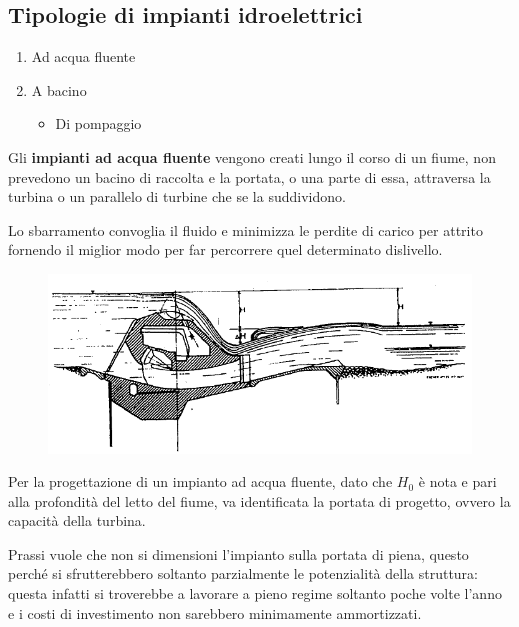 \documentclass[a4paper, 15pt]{article}
\begin{document}
\subsection{Tipologie di impianti idroelettrici}
\begin{adjustwidth}{2in}{}
	
	\begin{enumerate}
		\item Ad acqua fluente 
		\item A bacino
		\begin{itemize}
			\item Di pompaggio
		\end{itemize}
	\end{enumerate}

	Gli \textbf{impianti ad acqua fluente} vengono creati lungo il corso di un fiume, non prevedono un bacino di raccolta e la portata, o una parte di essa, attraversa la turbina o un parallelo di turbine che se la suddividono.
	
	Lo sbarramento convoglia il fluido e minimizza le perdite di carico per attrito fornendo il miglior modo per far percorrere quel determinato dislivello. 	
\begin{figure}[H]
	\centering
	\includegraphics[width=0.7\linewidth]{immagini/caputo2}
	\label{fig:caputo2}
\end{figure}
	Per la progettazione di un impianto ad acqua fluente, dato che $H_0$ è nota e pari alla profondità del letto del fiume, va identificata la portata di progetto, ovvero la capacità della turbina. \newline
	
	Prassi vuole che non si dimensioni l'impianto sulla portata di piena, questo perché si sfrutterebbero soltanto parzialmente le potenzialità della struttura: questa infatti si troverebbe a lavorare a pieno regime soltanto poche volte l'anno e i costi di investimento non sarebbero minimamente ammortizzati. 
	

\end{adjustwidth}
\end{document}

